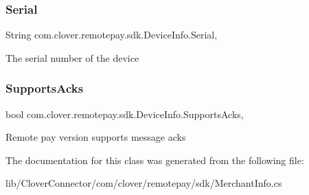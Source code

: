 \subsubsection{\texorpdfstring{Serial}{Serial}}
{\footnotesize\ttfamily String com.\+clover.\+remotepay.\+sdk.\+Device\+Info.\+Serial\hspace{0.3cm}{\ttfamily [get]}, {\ttfamily [set]}}



The serial number of the device 

\mbox{\label{classcom_1_1clover_1_1remotepay_1_1sdk_1_1_device_info_a508f3952d0ea526c63939e66ca36ea9b}} 
\subsubsection{\texorpdfstring{Supports\+Acks}{SupportsAcks}}
{\footnotesize\ttfamily bool com.\+clover.\+remotepay.\+sdk.\+Device\+Info.\+Supports\+Acks\hspace{0.3cm}{\ttfamily [get]}, {\ttfamily [set]}}



Remote pay version supports message acks 



The documentation for this class was generated from the following file\+:\begin{DoxyCompactItemize}
\item 
lib/\+Clover\+Connector/com/clover/remotepay/sdk/Merchant\+Info.\+cs\end{DoxyCompactItemize}
